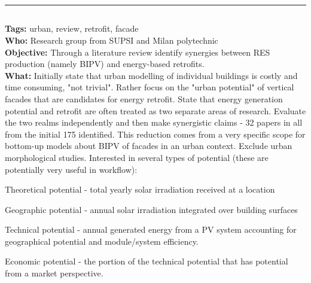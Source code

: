 \documentclass[11pt,a4paper]{article}
\makeatletter
\renewcommand{\maketitle}{\bgroup
   \begin{center}
   \textbf{{\fontsize{18pt}{20}\selectfont \@title}}\\
   \vspace{10pt}
   {\fontsize{12pt}{0}\selectfont \@author} 
   \end{center}
}
\newenvironment{itemize*}%
  {\begin{itemize}[rightmargin=\dimexpr\linewidth-120mm-\leftmargin\relax]%
    \setlength{\itemsep}{0pt}%
    \setlength{\parskip}{0pt}}%
  {\end{itemize}}
\makeatother
\begin{document}

\thispagestyle{fancy}


\noindent\rule{\textwidth}{1pt}
\subsection*{}
\textbf{Tags:} urban, review, retrofit, facade  \\
\textbf{Who:} Research group from SUPSI and Milan polytechnic \\
\textbf{Objective:} Through a literature review identify synergies between RES production (namely BIPV) and energy-based retrofits. \\
\textbf{What:} Initially state that urban modelling of individual buildings is costly and time consuming, "not trivial". Rather focus on the "urban potential" of vertical facades that are candidates for energy retrofit. State that energy generation potential and retrofit are often treated as two separate areas of research. Evaluate the two realms independently and then make synergistic claims - 32 papers in all from the initial 175 identified. This reduction comes from a very specific scope for bottom-up models about BIPV of facades in an urban context. Exclude urban morphological studies. Interested in several types of potential (these are potentially very useful in workflow):

\begin{itemize*}
    \item Theoretical potential - total yearly solar irradiation received at a location
    \item Geographic potential - annual solar irradiation integrated over building surfaces
    \item Technical potential - annual generated energy from a PV system accounting for geographical potential and module/system efficiency.
    \item Economic potential - the portion of the technical potential that has potential from a market perspective.
\end{itemize*}
\end{document}
